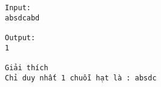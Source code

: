 \begin{verbatim}
Input:
absdcabd

Output:
1

Giải thích
Chỉ duy nhất 1 chuỗi hạt là : absdc

\end{verbatim}
